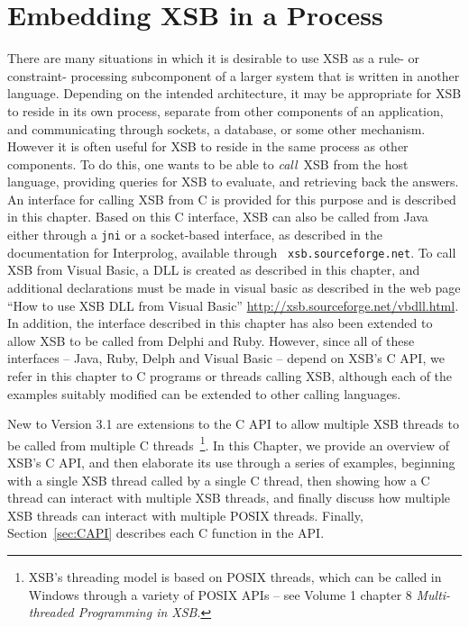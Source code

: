 \chapter{Embedding XSB in a Process}
\label{ccallingxsb}

There are many situations in which it is desirable to use XSB as a
rule- or constraint- processing subcomponent of a larger system that
is written in another language.  Depending on the intended
architecture, it may be appropriate for XSB to reside in its own
process, separate from other components of an application, and
communicating through sockets, a database, or some other mechanism.
However it is often useful for XSB to reside in the same process as
other components.  To do this, one wants to be able to {\em call}\ XSB
from the host language, providing queries for XSB to evaluate, and
retrieving back the answers.  An interface for calling XSB from C is
provided for this purpose and is described in this chapter.  Based on
this C interface, XSB can also be called from Java either through a
{\tt jni} or a socket-based interface, as described in the
documentation for Interprolog, available through {\tt
  xsb.sourceforge.net}.  To call XSB from Visual Basic, a DLL is
created as described in this chapter, and additional declarations must
be made in visual basic as described in the web page ``How to use XSB
DLL from Visual Basic'' \url{http://xsb.sourceforge.net/vbdll.html}.
In addition, the interface described in this chapter has also been
extended to allow XSB to be called from Delphi and Ruby.  However,
since all of these interfaces -- Java, Ruby, Delph and Visual Basic --
depend on XSB's C API, we refer in this chapter to C programs or
threads calling XSB, although each of the examples suitably modified
can be extended to other calling languages.

New to Version 3.1 are extensions to the C API to allow multiple XSB
threads to be called from multiple C threads~\footnote{XSB's threading
  model is based on POSIX threads, which can be called in Windows
  through a variety of POSIX APIs -- see Volume 1 chapter 8 {\em
    Multi-threaded Programming in XSB}.}.  In this Chapter, we provide
an overview of XSB's C API, and then elaborate its use through a
series of examples, beginning with a single XSB thread called by a
single C thread, then showing how a C thread can interact with
multiple XSB threads, and finally discuss how multiple XSB threads can
interact with multiple POSIX threads.  Finally, Section~\ref{sec:CAPI}
describes each C function in the API.

